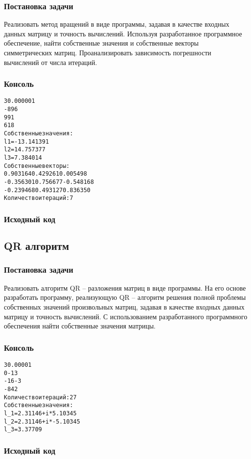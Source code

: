 \subsubsection{Постановка задачи}
Реализовать метод вращений в виде программы, задавая в качестве входных данных матрицу и точность вычислений. Используя разработанное программное обеспечение, найти собственные значения и собственные векторы симметрических матриц. Проанализировать зависимость погрешности вычислений от числа итераций.

\subsubsection{Консоль}
\begin{alltt}
3 0.000001
-8 9 6
9 9 1
6 1 8
Собственные значения:
l1 = -13.141391
l2 = 14.757377
l3 = 7.384014
Собственные векторы: 
0.903164 0.429261 0.005498 
-0.356301 0.756677 -0.548168 
-0.239468 0.493127 0.836350 
Количество итераций: 7
\end{alltt}
\pagebreak

\subsubsection{Исходный код}

\pagebreak

\subsection{QR алгоритм}

\subsubsection{Постановка задачи}
Реализовать алгоритм QR – разложения матриц в виде программы. На его основе разработать программу, реализующую QR – алгоритм решения полной проблемы собственных значений произвольных матриц, задавая в качестве входных данных матрицу и точность вычислений. С использованием разработанного программного обеспечения найти собственные значения матрицы.

\subsubsection{Консоль}
\begin{alltt}
3 0.00001
0 -1 3
-1 6 -3
-8 4 2
Количество итераций: 27
Собственные значения:
l_1 = 2.31146 + i * 5.10345
l_2 = 2.31146 + i * -5.10345
l_3 = 3.37709
\end{alltt}
\pagebreak

\subsubsection{Исходный код}

\pagebreak
